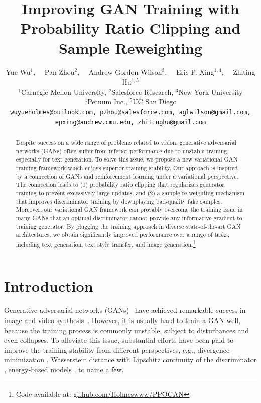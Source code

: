 \documentclass{article}
\title{Improving GAN Training with Probability Ratio Clipping and Sample Reweighting}
\author{Yue Wu$^1$,~~ Pan Zhou$^2$,~~ Andrew Gordon Wilson$^3$,~~ Eric P. Xing$^{1,4}$,~~ Zhiting Hu$^{1,5}$ \\
	$^1$Carnegie Mellon University, $^2$Salesforce Research, $^3$New York University\\
	$^4$Petuum Inc., $^5$UC San Diego\\
	{ \texttt \tt wuyueholmes@outlook.com,}\ {\texttt \tt pzhou@salesforce.com,}\ {\texttt\tt aglwilson@gmail.com,}\\ 
	{\texttt \tt epxing@andrew.cmu.edu,}\ {\texttt \tt zhitinghu@gmail.com}
}
\newcommand{\0}{\bm{0}}
\begin{document}
\newtheorem{claim}{Claim}[section]
\newtheorem{prop}{Proposition}[section]
\newenvironment{psketch}{\renewcommand{\proofname}{Proof sketch}\proof}{\endproof}
\maketitle
  


\begin{abstract}
Despite success on a wide range of problems related to vision, generative adversarial networks (GANs) often suffer from inferior performance due to unstable training, especially for text generation. To solve this issue, we propose a new variational GAN training framework which enjoys superior  training stability. Our approach is inspired by a connection of GANs and reinforcement learning under a variational perspective. The connection leads to (1) probability ratio clipping that regularizes generator training to prevent excessively large updates, and (2) a sample re-weighting mechanism that improves discriminator training by downplaying bad-quality fake samples.  Moreover, our  variational GAN framework  can provably overcome the training issue in many GANs that an optimal discriminator cannot provide any  informative gradient to training generator. 
By plugging the training approach in diverse state-of-the-art GAN architectures, we obtain significantly improved performance over a range of tasks, including text generation, text style transfer, and image generation.\footnote{Code available at: \href{https://github.com/Holmeswww/PPOGAN}{github.com/Holmeswww/PPOGAN}}







\end{abstract}

\section{Introduction}
\label{sec:intro}
Generative adversarial networks (GANs)~\citep{goodfellow2014generative} have achieved remarkable success in image and video synthesis~\cite{DCGAN,brock2018large,mathieu2015deep}. However, it is usually hard to train a GAN well, because the training process is commonly unstable, subject to disturbances and even collapses. 
To alleviate this issue, substantial efforts have been paid to improve the training stability from different perspectives, 
e.g., divergence minimization \cite{nowozin2016f,nock2017f}, Wasserstein distance with Lipschitz continuity of the discriminator \cite{WGAN,wgangp,wwgan}, energy-based models \cite{zhao2016energy,berthelot2017began}, to name a few. 
\end{document}
